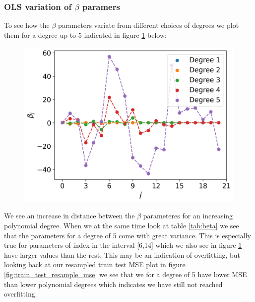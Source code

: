 \documentclass[12pt]{article}
\begin{document}
\subsubsection{OLS variation of $\beta$ paramers}

To see how the $\beta$ parameters variate from different choices of degrees we plot them for a degree up to 5 indicated in figure \ref{fig:beta} below:
\begin{figure}[H]
  \centering
  \includegraphics[width=.7\textwidth]{../figures/beta_degree.png}
  \caption{}
  \label{fig:beta}
\end{figure}
We see an increase in distance between the $\beta$ parameteres for an increasing polynomial degree. When we at the same time look at table \ref{tab:beta} we see that the parameters for a degree of 5 come with great variance. This is especially true for parameters of index in the interval [6,14] which we also see in figure \ref{fig:beta} have larger values than the rest. This may be an indication of overfitting, but looking back at our resampled train test MSE plot in figure \ref{fig:train_test_resample_mse} we see that we for a degree of 5 have lower MSE than lower polynomial degrees which indicates we have still not reached overfitting.
\end{document}
